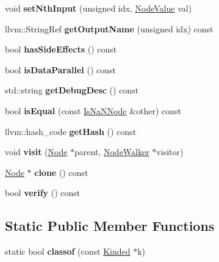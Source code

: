 \begin{DoxyCompactItemize}
void {\bfseries set\+Nth\+Input} (unsigned idx, \hyperlink{structglow_1_1_node_value}{Node\+Value} val)
\item 
\mbox{\label{classglow_1_1_is_na_n_node_afed15a9cf7169feac88f5e7c9fb184aa}} 
llvm\+::\+String\+Ref {\bfseries get\+Output\+Name} (unsigned idx) const
\item 
\mbox{\label{classglow_1_1_is_na_n_node_aed6c7ca0e60c534a2edb53b4b4c1ce41}} 
bool {\bfseries has\+Side\+Effects} () const
\item 
\mbox{\label{classglow_1_1_is_na_n_node_af2f9e7b5f8a2f080c78afe69fba667f0}} 
bool {\bfseries is\+Data\+Parallel} () const
\item 
\mbox{\label{classglow_1_1_is_na_n_node_aaff9dcb21b3c460d28955472f7fb6778}} 
std\+::string {\bfseries get\+Debug\+Desc} () const
\item 
\mbox{\label{classglow_1_1_is_na_n_node_a7cfe95a43000f626fd24b76d37f0d0b3}} 
bool {\bfseries is\+Equal} (const \hyperlink{classglow_1_1_is_na_n_node}{Is\+Na\+N\+Node} \&other) const
\item 
\mbox{\label{classglow_1_1_is_na_n_node_a495dfa9dd734fac2ee6b0ff5cae56f66}} 
llvm\+::hash\+\_\+code {\bfseries get\+Hash} () const
\item 
\mbox{\label{classglow_1_1_is_na_n_node_a3bf35a95999418b6ed598385da344b6b}} 
void {\bfseries visit} (\hyperlink{classglow_1_1_node}{Node} $\ast$parent, \hyperlink{classglow_1_1_node_walker}{Node\+Walker} $\ast$visitor)
\item 
\mbox{\label{classglow_1_1_is_na_n_node_a1f39b6e663f17cf46df6cd76902ba2d0}} 
\hyperlink{classglow_1_1_node}{Node} $\ast$ {\bfseries clone} () const
\item 
\mbox{\label{classglow_1_1_is_na_n_node_a714644a114da209eb013c2bbf94975fe}} 
bool {\bfseries verify} () const
\end{DoxyCompactItemize}
\subsection*{Static Public Member Functions}
\begin{DoxyCompactItemize}
\item 
\mbox{\label{classglow_1_1_is_na_n_node_acf05e15e0081826d8ca9e870d1e646b9}} 
static bool {\bfseries classof} (const \hyperlink{classglow_1_1_kinded}{Kinded} $\ast$k)
\end{DoxyCompactItemize}
